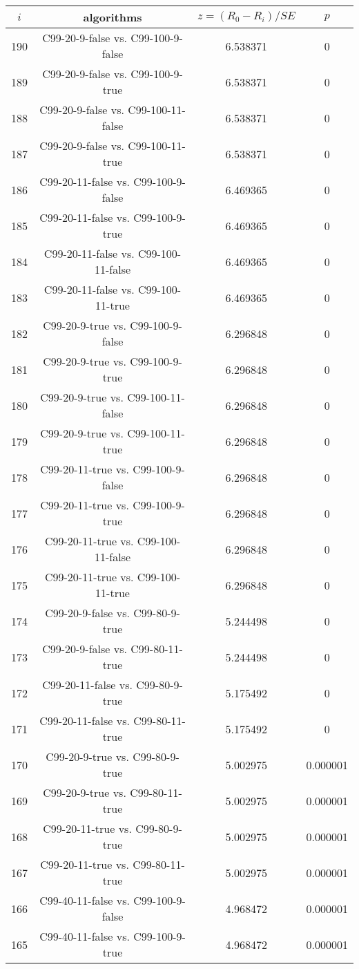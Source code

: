 \documentclass[a4paper,10pt]{article}
\begin{document}
\begin{landscape}
\begin{table}[!htp]
\centering\scriptsize
\begin{tabular}{cccc}
$i$&algorithms&$z=(R_0 - R_i)/SE$&$p$\\
\hline190&C99-20-9-false vs. C99-100-9-false&6.538371&0\\
189&C99-20-9-false vs. C99-100-9-true&6.538371&0\\
188&C99-20-9-false vs. C99-100-11-false&6.538371&0\\
187&C99-20-9-false vs. C99-100-11-true&6.538371&0\\
186&C99-20-11-false vs. C99-100-9-false&6.469365&0\\
185&C99-20-11-false vs. C99-100-9-true&6.469365&0\\
184&C99-20-11-false vs. C99-100-11-false&6.469365&0\\
183&C99-20-11-false vs. C99-100-11-true&6.469365&0\\
182&C99-20-9-true vs. C99-100-9-false&6.296848&0\\
181&C99-20-9-true vs. C99-100-9-true&6.296848&0\\
180&C99-20-9-true vs. C99-100-11-false&6.296848&0\\
179&C99-20-9-true vs. C99-100-11-true&6.296848&0\\
178&C99-20-11-true vs. C99-100-9-false&6.296848&0\\
177&C99-20-11-true vs. C99-100-9-true&6.296848&0\\
176&C99-20-11-true vs. C99-100-11-false&6.296848&0\\
175&C99-20-11-true vs. C99-100-11-true&6.296848&0\\
174&C99-20-9-false vs. C99-80-9-true&5.244498&0\\
173&C99-20-9-false vs. C99-80-11-true&5.244498&0\\
172&C99-20-11-false vs. C99-80-9-true&5.175492&0\\
171&C99-20-11-false vs. C99-80-11-true&5.175492&0\\
170&C99-20-9-true vs. C99-80-9-true&5.002975&0.000001\\
169&C99-20-9-true vs. C99-80-11-true&5.002975&0.000001\\
168&C99-20-11-true vs. C99-80-9-true&5.002975&0.000001\\
167&C99-20-11-true vs. C99-80-11-true&5.002975&0.000001\\
166&C99-40-11-false vs. C99-100-9-false&4.968472&0.000001\\
165&C99-40-11-false vs. C99-100-9-true&4.968472&0.000001\\

\end{tabular}
\end{table}
\end{landscape}
\end{document}

